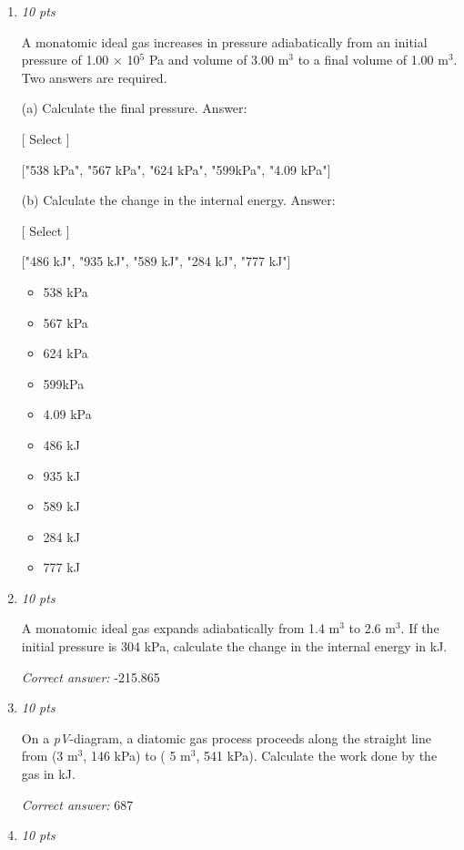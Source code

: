 \documentclass[11pt]{article}
\begin{document}
\begin{enumerate}[leftmargin=*,label=\textbf{Question \arabic*.}]
A diatomic ideal gas is compressed adiabatically from 2.8 m$^{3}$ to 1.4 m$^{3}$. If the initial pressure is 81 kPa, calculate the final pressure in kPa.

\textit{Correct answer:} 213.7603

\item \hfill \textit{10 pts}

A monatomic ideal gas increases in pressure adiabatically from an initial pressure of 1.00 × 10$^{5}$ Pa and volume of 3.00 m$^{3}$ to a final volume of 1.00 m$^{3}$.  Two answers are required.

(a) Calculate the final pressure. Answer:

    [ Select ]

  ["538 kPa", "567 kPa", "624 kPa", "599kPa", "4.09 kPa"]

(b) Calculate the change in the internal energy. Answer:

    [ Select ]

  ["486 kJ", "935 kJ", "589 kJ", "284 kJ", "777 kJ"]

\begin{itemize}
  \item 538 kPa
  \item 567 kPa
  \item 624 kPa
  \item 599kPa
  \item 4.09 kPa
  \item 486 kJ
  \item 935 kJ
  \item 589 kJ
  \item 284 kJ
  \item 777 kJ
\end{itemize}

\item \hfill \textit{10 pts}

A monatomic ideal gas expands adiabatically from 1.4 m$^{3}$ to 2.6 m$^{3}$. If the initial pressure is 304 kPa, calculate the change in the internal energy in kJ.

\textit{Correct answer:} -215.865

\item \hfill \textit{10 pts}

On a \emph{pV}-diagram, a diatomic gas process proceeds along the straight line from (3 m$^{3}$, 146 kPa) to ( 5 m$^{3}$, 541 kPa). Calculate the work done by the gas in kJ.

\textit{Correct answer:} 687

\item \hfill \textit{10 pts}


\end{enumerate}
\end{document}
